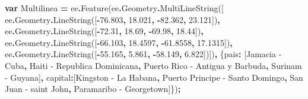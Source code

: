 \documentclass[
  12pt,
  letterpaper,
  twoside]{book}
\newenvironment{Shaded}{\begin{snugshade}}{\end{snugshade}}
\newcommand{\AttributeTok}[1]{\textcolor[rgb]{0.77,0.63,0.00}{#1}}
\newcommand{\DataTypeTok}[1]{\textcolor[rgb]{0.13,0.29,0.53}{#1}}
\newcommand{\FloatTok}[1]{\textcolor[rgb]{0.00,0.00,0.81}{#1}}
\newcommand{\FunctionTok}[1]{\textcolor[rgb]{0.00,0.00,0.00}{#1}}
\newcommand{\KeywordTok}[1]{\textcolor[rgb]{0.13,0.29,0.53}{\textbf{#1}}}
\newcommand{\NormalTok}[1]{#1}
\newcommand{\OperatorTok}[1]{\textcolor[rgb]{0.81,0.36,0.00}{\textbf{#1}}}
\newcommand{\StringTok}[1]{\textcolor[rgb]{0.31,0.60,0.02}{#1}}
\begin{document}
\begin{Shaded}
\begin{Highlighting}[]
\KeywordTok{var}\NormalTok{ Multilinea }\OperatorTok{=}\NormalTok{ ee}\OperatorTok{.}\FunctionTok{Feature}\NormalTok{(ee}\OperatorTok{.}\AttributeTok{Geometry}\OperatorTok{.}\FunctionTok{MultiLineString}\NormalTok{([  }
\NormalTok{    ee}\OperatorTok{.}\AttributeTok{Geometry}\OperatorTok{.}\FunctionTok{LineString}\NormalTok{([}\OperatorTok{{-}}\FloatTok{76.803}\OperatorTok{,} \FloatTok{18.021}\OperatorTok{,} \OperatorTok{{-}}\FloatTok{82.362}\OperatorTok{,} \FloatTok{23.121}\NormalTok{])}\OperatorTok{,}      
\NormalTok{    ee}\OperatorTok{.}\AttributeTok{Geometry}\OperatorTok{.}\FunctionTok{LineString}\NormalTok{([}\OperatorTok{{-}}\FloatTok{72.31}\OperatorTok{,} \FloatTok{18.69}\OperatorTok{,} \OperatorTok{{-}}\FloatTok{69.98}\OperatorTok{,} \FloatTok{18.44}\NormalTok{])}\OperatorTok{,}        
\NormalTok{    ee}\OperatorTok{.}\AttributeTok{Geometry}\OperatorTok{.}\FunctionTok{LineString}\NormalTok{([}\OperatorTok{{-}}\FloatTok{66.103}\OperatorTok{,} \FloatTok{18.4597}\OperatorTok{,} \OperatorTok{{-}}\FloatTok{61.8558}\OperatorTok{,} \FloatTok{17.1315}\NormalTok{])}\OperatorTok{,}
\NormalTok{    ee}\OperatorTok{.}\AttributeTok{Geometry}\OperatorTok{.}\FunctionTok{LineString}\NormalTok{([}\OperatorTok{{-}}\FloatTok{55.165}\OperatorTok{,} \FloatTok{5.861}\OperatorTok{,} \OperatorTok{{-}}\FloatTok{58.149}\OperatorTok{,} \FloatTok{6.822}\NormalTok{])])}\OperatorTok{,}
\NormalTok{    \{}\DataTypeTok{pais}\OperatorTok{:}\NormalTok{  [}\StringTok{\textquotesingle{}Jamacia {-} Cuba\textquotesingle{}}\OperatorTok{,}
            \StringTok{\textquotesingle{}Haiti {-} Republica Dominicana\textquotesingle{}}\OperatorTok{,}
            \StringTok{\textquotesingle{}Puerto Rico {-} Antigua y Barbuda\textquotesingle{}}\OperatorTok{,}
            \StringTok{\textquotesingle{}Surinam {-} Guyana\textquotesingle{}}\NormalTok{]}\OperatorTok{,}
    \DataTypeTok{capital}\OperatorTok{:}\NormalTok{[}\StringTok{\textquotesingle{}Kingston {-} La Habana\textquotesingle{}}\OperatorTok{,}
            \StringTok{\textquotesingle{}Puerto Principe {-} Santo Domingo\textquotesingle{}}\OperatorTok{,}
            \StringTok{\textquotesingle{}San Juan {-} saint John\textquotesingle{}}\OperatorTok{,}
            \StringTok{\textquotesingle{}Paramaribo {-} Georgetown\textquotesingle{}}\NormalTok{]\})}\OperatorTok{;}


\end{Highlighting}
\end{Shaded}
\end{document}
